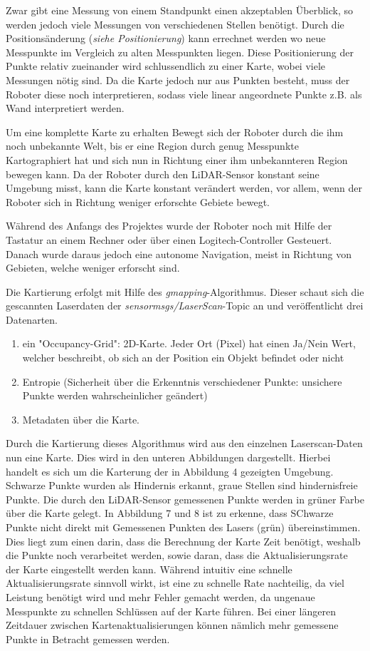 {{		Zwar gibt eine Messung von einem Standpunkt einen akzeptablen Überblick, so werden jedoch viele Messungen von verschiedenen Stellen benötigt. Durch die Positionsänderung (\textit{siehe Positionierung}) kann errechnet werden wo neue Messpunkte im Vergleich zu alten Messpunkten liegen. Diese Positionierung der Punkte relativ zueinander wird schlussendlich zu einer Karte, wobei viele Messungen nötig sind. Da die Karte jedoch nur aus Punkten besteht, muss der Roboter diese noch interpretieren, sodass viele linear angeordnete Punkte z.B. als Wand interpretiert werden.
		
		Um eine komplette Karte zu erhalten Bewegt sich der Roboter durch die ihm noch unbekannte Welt, bis er eine Region durch genug Messpunkte Kartographiert hat und sich nun in Richtung einer ihm unbekannteren Region bewegen kann. Da der Roboter durch den LiDAR-Sensor konstant seine Umgebung misst, kann die Karte konstant verändert werden, vor allem, wenn der Roboter sich in Richtung weniger erforschte Gebiete bewegt.
		
		Während des Anfangs des Projektes wurde der Roboter noch mit Hilfe der Tastatur an einem Rechner oder über einen Logitech-Controller Gesteuert. Danach wurde daraus jedoch eine autonome Navigation, meist in Richtung von Gebieten, welche weniger erforscht sind. 
		
		Die Kartierung erfolgt mit Hilfe des \textit{gmapping}-Algorithmus. Dieser schaut sich die gescannten Laserdaten der \textit{sensor\textunderscore msgs/LaserScan}-Topic an und veröffentlicht drei Datenarten.
		\begin{enumerate}
			\item ein "Occupancy-Grid": 2D-Karte. Jeder Ort (Pixel) hat einen Ja/Nein Wert, welcher beschreibt, ob sich an der Position ein Objekt befindet oder nicht
			\item Entropie (Sicherheit über die Erkenntnis verschiedener Punkte: unsichere Punkte werden wahrscheinlicher geändert)
			\item Metadaten über die Karte.
		\end{enumerate}
	
		Durch die Kartierung dieses Algorithmus wird aus den einzelnen Laserscan-Daten nun eine Karte. Dies wird in den unteren Abbildungen dargestellt. Hierbei handelt es sich um die Karterung der in Abbildung 4 gezeigten Umgebung. Schwarze Punkte wurden als Hindernis erkannt, graue Stellen sind hindernisfreie Punkte. Die durch den LiDAR-Sensor gemessenen Punkte werden in grüner Farbe über die Karte gelegt. In Abbildung 7 und 8 ist zu erkenne, dass SChwarze Punkte nicht direkt mit Gemessenen Punkten des Lasers (grün) übereinstimmen. Dies liegt zum einen darin, dass die Berechnung der Karte Zeit benötigt, weshalb die Punkte noch verarbeitet werden, sowie daran, dass die Aktualisierungsrate der Karte eingestellt werden kann. Während intuitiv eine schnelle Aktualisierungsrate sinnvoll wirkt, ist eine zu schnelle Rate nachteilig, da viel Leistung benötigt wird und mehr Fehler gemacht werden, da ungenaue Messpunkte zu schnellen Schlüssen auf der Karte führen. Bei einer längeren Zeitdauer zwischen Kartenaktualisierungen können nämlich mehr gemessene Punkte in Betracht gemessen werden.
		
}}
